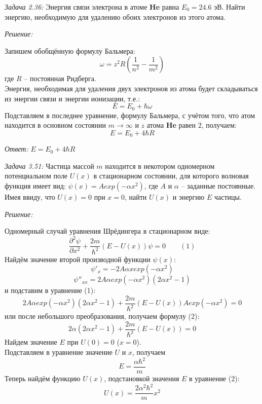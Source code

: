 
\emph{Задача 2.36: }
Энергия связи электрона в атоме \textbf{He} равна \( E_0 = 24.6 \) эВ. Найти энергию,
необходимую для удалению обоих электронов из этого атома.

\emph{Решение:}

Запишем обобщённую формулу Бальмера:
	\[ \omega = z^2 R(\frac{1}{n^2}-\frac{1}{m^2}) \]
где \( R \) -- постоянная Ридберга.\\
Энергия, необходимая для удаления двух электронов из атома будет складываться из 
энергии связи и энергии ионизации, т.е.:
	\[ E = E_0 + \hbar\omega \]
Подставляем в последнее уравнение, формулу Бальмера, 
с учётом того, что атом находится в основном состоянии \( m \rightarrow \infty \) и
\( z \) атома \textbf{He} равен \( 2 \), получаем:
	\[ E = E_0 + 4\hbar R \]

\emph{Ответ:} \( E = E_0 + 4\hbar R \)

\newpage


\emph{Задача 3.51:}
Частица массой \( m \) находится в некотором одномерном \\
потенциальном поле \( U(x) \) в стационарном состоянии, для которого волновая 
функция имеет вид: \( \psi(x) = Aexp(-\alpha x^2) \), где \( A \) и 
\( \alpha \) -- заданные постоянные. Имея ввиду, что \( U(x) = 0 \) при 
\( x = 0 \), найти \( U(x) \) и энергию \( E \) частицы.

\emph{Решение:}

Одномерный случай уравнения Шрёдингера в стационарном виде: 
	\[ 
		\frac{\partial^2\psi}{\partial x^2} + 
		\frac{2m}{\hbar^2}(E-U(x))\psi = 0\quad\quad(1)
	\]
Найдём значение второй производной функции \( \psi(x) \):
	\[ \psi'_{x} = -2A\alpha x exp(-\alpha x^2) \]
	\[ \psi''_{xx} = 2A\alpha exp(-\alpha x^2)(2\alpha x^2 - 1) \]
и подставим в уравнение (1):
	\[ 2A\alpha exp(-\alpha x^2)(2\alpha x^2 - 1) 
	   + \frac{2m}{\hbar^2}(E - U(x))Aexp(-\alpha x^2) = 0 
	\]
или после небольшого преобразования, получаем формулу (2):
	\[ 2\alpha(2\alpha x^2 - 1) + \frac{2m}{\hbar^2}(E - U(x)) = 0 \]
Найдем значение \( E \) при \( U(0) = 0 \) (\( x = 0 \)). \\
Подставляем в уравнение значение \( U \) и \( x \), получаем 
	\[ E = \frac{\alpha\hbar^2}{m} \]
Теперь найдём функцию \( U(x) \), подстановкой значения \( E \) в уравнение (2):
	\[ U(x) = \frac{2\alpha^2\hbar^2}{m}x^2 \]

